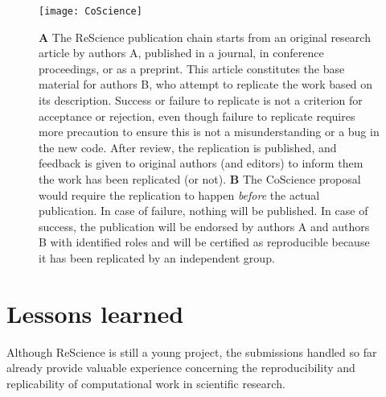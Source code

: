 \documentclass[a4paper,10pt, twocolumn]{article}
\begin{document}



\begin{figure}
  \texttt{[image: CoScience]}
  \caption{\textbf{A} The ReScience publication chain starts from an
    original research article by authors A, published in a journal, in
    conference proceedings, or as a preprint. This article constitutes
    the base material for authors B, who attempt to replicate the work
    based on its description. Success or failure to replicate is not a
    criterion for acceptance or rejection, even though failure to
    replicate requires more precaution to ensure this is not a
    misunderstanding or a bug in the new code. After review, the
    replication is published, and feedback is given to original
    authors (and editors) to inform them the work has been replicated
    (or not). \textbf{B} The CoScience proposal would require the
    replication to happen \textit{before} the actual publication. In
    case of failure, nothing will be published. In case of success,
    the publication will be endorsed by authors A and authors B with
    identified roles and will be certified as reproducible because it
    has been replicated by an independent group.}
  \label{fig:coscience}
\end{figure}


\section*{Lessons learned}

Although ReScience is still a young project, the submissions handled
so far already provide valuable experience concerning the
reproducibility and replicability of computational work in scientific
research.
\end{document}
